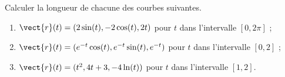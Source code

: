 \begin{exercice}\label{exodevoir3-0004}

Calculer la longueur de chacune des courbes suivantes. 
\begin{enumerate}
    \item $\vect{r}(t)= (2\sin(t), -2\cos(t), 2t)$ pour $t$ dans l'intervalle $[0,2\pi]$ ;
    \item $\vect{r}(t)= (e^{-t}\cos(t), e^{-t}\sin(t), e^{-t})$ pour $t$ dans l'intervalle $[0,2]$ ;
    \item $\vect{r}(t)= (t^2, 4t+3, -4\ln(t))$ pour $t$ dans l'intervalle $[1,2]$.  
\end{enumerate}
\end{exercice}


